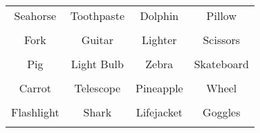 \documentclass[12pt,a4paper]{article}
\begin{document}
\thispagestyle{empty}
\begin{table}[]
\centering
\Huge
\begin{tabular}{cccc}
 Seahorse& Toothpaste& Dolphin& Pillow\\  & & & \\
 Fork& Guitar& Lighter& Scissors\\  & & & \\
 Pig& Light Bulb& Zebra& Skateboard\\  & & & \\
 Carrot& Telescope& Pineapple& Wheel\\  & & & \\
 Flashlight& Shark& Lifejacket& Goggles\\  & & & \\
\end{tabular}
\end{table}
\end{document}
